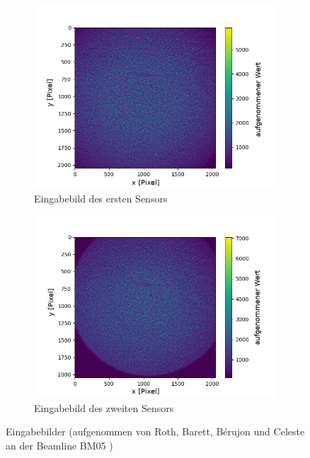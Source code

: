 \begin{figure}[h!]
	\centering
	\begin{subfigure}[b]{0.45\textwidth}
		\centering
		\includegraphics[width=\textwidth]{img/ref_start0001_1-10}
		\caption[Erster Sensor]{Eingabebild des ersten Sensors}
		\label{fig:eingabe_sensor1}
	\end{subfigure}
	\begin{subfigure}[b]{0.45\textwidth}
		\centering
		\includegraphics[width=\textwidth]{img/E10001}
		\caption[Zweiter Sensor]{Eingabebild des zweiten Sensors}
		\label{fig:eingabe_sensor2}
	\end{subfigure}
	\caption[Eingabe]{Eingabebilder (aufgenommen von Roth, Barett, Bérujon und Celeste an der Beamline BM05 \cite{RBB+17})}
	\label{fig:eingabebilder}
\end{figure}

